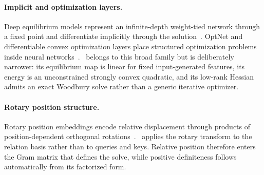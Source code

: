 \paragraph{Implicit and optimization layers.}
Deep equilibrium models represent an infinite-depth weight-tied network through a fixed point and differentiate implicitly through the solution~\cite{bai2019deq}. OptNet and differentiable convex optimization layers place structured optimization problems inside neural networks~\cite{amos2017optnet,agrawal2019cvxpylayers}. \LSSO\ belongs to this broad family but is deliberately narrower: its equilibrium map is linear for fixed input-generated features, its energy is an unconstrained strongly convex quadratic, and its low-rank Hessian admits an exact Woodbury solve rather than a generic iterative optimizer.

\paragraph{Rotary position structure.}
Rotary position embeddings encode relative displacement through products of position-dependent orthogonal rotations~\cite{su2024roformer}. \RRLSSO\ applies the rotary transform to the relation basis rather than to queries and keys. Relative position therefore enters the Gram matrix that defines the solve, while positive definiteness follows automatically from its factorized form.
